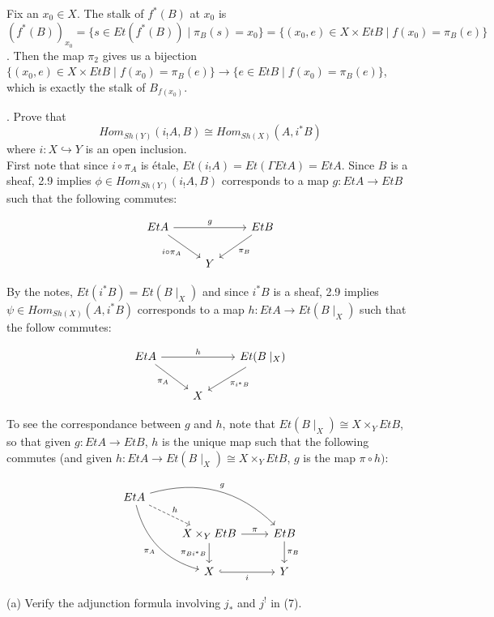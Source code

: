 Fix an $x_0 \in X$. The stalk of $f^*(B)$ at $x_0$ is $(f^*(B))_{x_0} = \{s \in Et(f^*(B)) \mid \pi_B(s) = x_0\} =\{(x_0,e) \in X \times EtB \mid f(x_0) = \pi_B(e)\}$. Then the map $\pi_2$ gives us a bijection $\{(x_0,e) \in X \times EtB \mid f(x_0) = \pi_B(e)\} \rightarrow \{e \in EtB \mid f(x_0)=\pi_B(e)\}$, which is exactly the stalk of $B_{f(x_0)}$.


. Prove that 
\[ Hom_{Sh(Y)}(i_!A, B) \cong Hom_{Sh(X)}(A,i^*B)\]
where $i: X \hookrightarrow Y$ is an open inclusion.\\

First note that since $i \circ \pi_A$ is \'etale, $Et(i_! A) = Et(\Gamma Et A) = Et A$. Since $B$ is a sheaf, 2.9 implies $\phi \in Hom_{Sh(Y)}(i_! A,B)$ corresponds to a map $g: EtA \rightarrow EtB$ such that the following commutes:

\[
\begin{tikzcd}
EtA \arrow[rr,"g"] \arrow[rd, "i \circ \pi_A"'] & & Et B \arrow[ld, "\pi_B"]\\
& Y 
\end{tikzcd}
\]

By the notes, $Et(i^*B) = Et(B\mid_X)$ and since $i^*B$ is a sheaf, 2.9 implies $\psi \in Hom_{Sh(X)}(A, i^*B)$ corresponds to a map $h: EtA \rightarrow Et(B\mid_X)$ such that the follow commutes:

\[
\begin{tikzcd}
EtA \arrow[rr,"h"] \arrow[rd, "\pi_A"'] & & Et(B\mid_X) \arrow[ld, "\pi_{i^*B}"]\\
& X 
\end{tikzcd}
\]

To see the correspondance between $g$ and $h$, note that $Et(B \mid_X) \cong X \times_Y EtB$, so that given $g:EtA \rightarrow EtB$, $h$ is the unique map such that the following commutes (and given $h:EtA \rightarrow Et(B\mid_X) \cong X \times_Y EtB$, $g$ is the map $\pi \circ h)$: 

\[
\begin{tikzcd}
EtA \arrow[ddr, bend right, "\pi_A"'] \arrow[drr, bend left, "g"] \arrow[dr, "h", dashed]\\
& X \times_Y EtB \arrow[r, "\pi"] \arrow[d, "\pi_{Bi^* B}"']
& EtB \arrow[d, "\pi_B"] \\
& X \arrow[r, "i"', hookrightarrow]
& Y
\end{tikzcd}
\]


 (a) Verify the adjunction formula involving $j_*$ and $j^!$ in (7).\\

